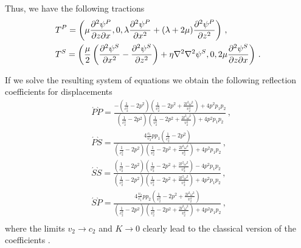 \documentclass[12pt]{article}
\begin{document}
Thus, we have the following tractions
\begin{align*}
  & T^P = \left(\mu\pdv{\psi^P}{z}{x}, 0, \lambda \pdv[2]{\psi^P}{x} + (\lambda + 2\mu)\pdv[2]{\psi^P}{z}\right)\, ,\\
  & T^S = \left(\frac{\mu}{2}\left(\pdv[2]{\psi^S}{x} - \pdv[2]{\psi^S}{z}\right) + \eta \laplacian\laplacian \psi^S, 0,
                2\mu\pdv{\psi^S}{z}{x}\right)\, .
\end{align*}


If we solve the resulting system of equations we obtain the following reflection coefficients for displacements
\begin{align*}
  &\acute{P}\grave{P} = \frac{-\left(\frac{1}{c_2^2} - 2 p^2\right)\left(\frac{1}{v_2^2} - 2 p^2 + \frac{2l^2\omega^2}{v_2^4}\right) + 4 p^2 p_1 p_2}
     {\left(\frac{1}{c_2^2} - 2 p^2\right)\left(\frac{1}{v_2^2} - 2 p^2 + \frac{2l^2\omega^2}{v_2^4}\right) + 4 p^2 p_1 p_2}\, ,\\
  &\acute{P}\grave{S} = \frac{4\frac{c_1}{v_2}p p_1\left(\frac{1}{c_2^2} - 2 p^2\right)}
     {\left(\frac{1}{c_2^2} - 2 p^2\right)\left(\frac{1}{v_2^2} - 2 p^2 + \frac{2l^2\omega^2}{v_2^4}\right) + 4 p^2 p_1 p_2}\, ,\\
  &\acute{S}\grave{S} = \frac{\left(\frac{1}{c_2^2} - 2 p^2\right)\left(\frac{1}{v_2^2} - 2 p^2 + \frac{2l^2\omega^2}{v_2^4}\right) - 4 p^2 p_1 p_2}
     {\left(\frac{1}{c_2^2} - 2 p^2\right)\left(\frac{1}{v_2^2} - 2 p^2 + \frac{2l^2\omega^2}{v_2^4}\right) + 4 p^2 p_1 p_2}\, ,\\
  &\acute{S}\grave{P} = \frac{4\frac{v_2}{c_1}p p_2\left(\frac{1}{v_2^2} - 2 p^2 + \frac{2l^2\omega^2}{v_2^4}\right)}
     {\left(\frac{1}{c_2^2} - 2 p^2\right)\left(\frac{1}{v_2^2} - 2 p^2 + \frac{2l^2\omega^2}{v_2^4}\right) + 4 p^2 p_1 p_2}\, ,\\
\end{align*}
where the limits \(v_2 \rightarrow c_2\) and \(K \rightarrow 0\) clearly lead to the classical version of the coefficients \citep{AkiAndRichards2002}.






\end{document}
